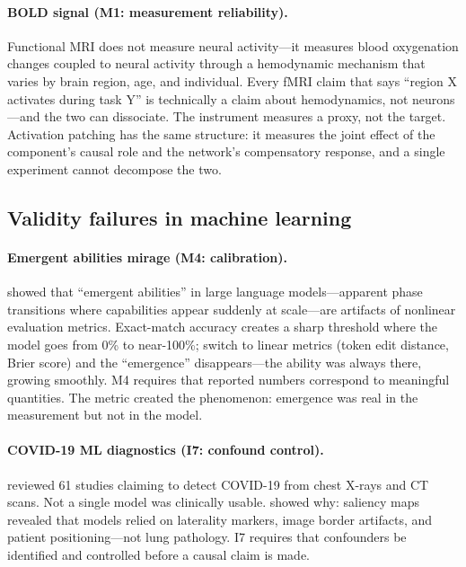\documentclass{article}
\begin{document}
\paragraph{BOLD signal (M1: measurement reliability).}
Functional MRI does not measure neural activity---it measures blood oxygenation changes coupled to neural activity through a hemodynamic mechanism that varies by brain region, age, and individual. Every fMRI claim that says ``region X activates during task Y'' is technically a claim about hemodynamics, not neurons---and the two can dissociate. The instrument measures a proxy, not the target. Activation patching has the same structure: it measures the joint effect of the component's causal role and the network's compensatory response, and a single experiment cannot decompose the two.

\subsection{Validity failures in machine learning}

\paragraph{Emergent abilities mirage (M4: calibration).}
\citet{schaeffer2024emergent} showed that ``emergent abilities'' in large language models---apparent phase transitions where capabilities appear suddenly at scale---are artifacts of nonlinear evaluation metrics. Exact-match accuracy creates a sharp threshold where the model goes from 0\% to near-100\%; switch to linear metrics (token edit distance, Brier score) and the ``emergence'' disappears---the ability was always there, growing smoothly. M4 requires that reported numbers correspond to meaningful quantities. The metric created the phenomenon: emergence was real in the measurement but not in the model.

\paragraph{COVID-19 ML diagnostics (I7: confound control).}
\citet{roberts2021common} reviewed 61 studies claiming to detect COVID-19 from chest X-rays and CT scans. Not a single model was clinically usable. \citet{degrave2021ai} showed why: saliency maps revealed that models relied on laterality markers, image border artifacts, and patient positioning---not lung pathology. I7 requires that confounders be identified and controlled before a causal claim is made.
\end{document}
